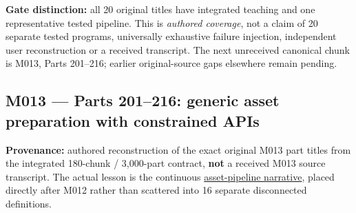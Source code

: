 \textbf{Gate distinction:} all 20 original titles have integrated teaching and one representative tested pipeline. This is \emph{authored coverage}, not a claim of 20 separate tested programs, universally exhaustive failure injection, independent user reconstruction or a received transcript. The next unreceived canonical chunk is M013, Parts 201--216; earlier original-source gaps elsewhere remain pending.

\subsection{M013 --- Parts 201--216: generic asset preparation with constrained APIs}\label{appendix-fd090d982a15-m013-parts-201216-generic-asset-preparation-with-constrained-apis}

\hypertarget{appendix-fd090d982a15-m013-parts-201216-generic-asset-preparation-with-constrained-apis}{}

\textbf{Provenance:} authored reconstruction of the exact original M013 part titles from the integrated 180-chunk / 3,000-part contract, \textbf{not} a received M013 source transcript. The actual lesson is the continuous \hyperref[01-foundations-i-ch005-one-asset-pipeline-many-asset-types-generic-code-without-accidental-promises]{asset-pipeline narrative}, placed directly after M012 rather than scattered into 16 separate disconnected definitions.


